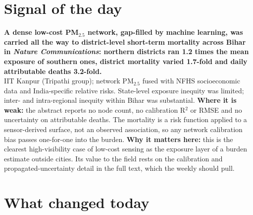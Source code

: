 \documentclass[10pt]{article}
\begin{document}
\vspace{6mm}

\section*{\sffamily\bfseries\color{Deep}Signal of the day}
\vspace{-1.5mm}{\color{Amber}\rule{\linewidth}{1.1pt}}\vspace{2.5mm}

\begin{keybox}
{\sffamily\bfseries\small\color{Deep}A dense low-cost PM$_{2.5}$ network, gap-filled by machine learning, was carried all the way to district-level short-term mortality across Bihar in \textit{Nature Communications}: northern districts ran 1.2 times the mean exposure of southern ones, district mortality varied 1.7-fold and daily attributable deaths 3.2-fold.}\\[1.4mm]
\footnotesize
IIT Kanpur (Tripathi group); network PM$_{2.5}$ fused with NFHS socioeconomic data and India-specific relative risks. State-level exposure inequity was limited; inter- and intra-regional inequity within Bihar was substantial.
\textbf{Where it is weak:} the abstract reports no node count, no calibration R$^2$ or RMSE and no uncertainty on attributable deaths. The mortality is a risk function applied to a sensor-derived surface, not an observed association, so any network calibration bias passes one-for-one into the burden.
\textbf{Why it matters here:} this is the clearest high-visibility case of low-cost sensing as the exposure layer of a burden estimate outside cities. Its value to the field rests on the calibration and propagated-uncertainty detail in the full text, which the weekly should pull.\par
\end{keybox}

\vspace{3mm}

\section*{\sffamily\bfseries\color{Deep}What changed today}
\vspace{-1.5mm}{\color{Amber}\rule{\linewidth}{1.1pt}}\vspace{2.5mm}
\end{document}
